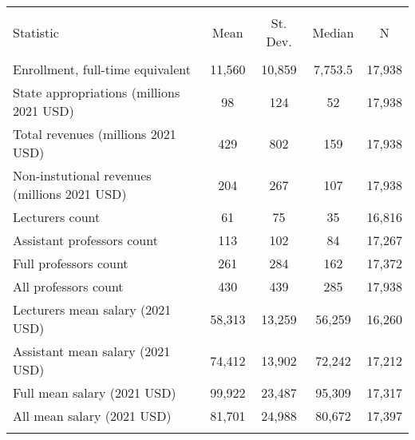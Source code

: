 
\begin{tabular}{@{\extracolsep{5pt}}lcccc} 
\\[-1.8ex]\hline 
\hline \\[-1.8ex] 
Statistic & \multicolumn{1}{c}{Mean} & \multicolumn{1}{c}{St. Dev.} & \multicolumn{1}{c}{Median} & \multicolumn{1}{c}{N} \\ 
\hline \\[-1.8ex] 
Enrollment, full-time equivalent & 11,560 & 10,859 & 7,753.5 & 17,938 \\ 
State appropriations (millions 2021 USD) & 98 & 124 & 52 & 17,938 \\ 
Total revenues (millions 2021 USD) & 429 & 802 & 159 & 17,938 \\ 
Non-instutional revenues (millions 2021 USD) & 204 & 267 & 107 & 17,938 \\ 
Lecturers count & 61 & 75 & 35 & 16,816 \\ 
Assistant professors count & 113 & 102 & 84 & 17,267 \\ 
Full professors count & 261 & 284 & 162 & 17,372 \\ 
All professors count & 430 & 439 & 285 & 17,938 \\ 
Lecturers mean salary (2021 USD) & 58,313 & 13,259 & 56,259 & 16,260 \\ 
Assistant mean salary (2021 USD) & 74,412 & 13,902 & 72,242 & 17,212 \\ 
Full mean salary (2021 USD) & 99,922 & 23,487 & 95,309 & 17,317 \\ 
All mean salary (2021 USD) & 81,701 & 24,988 & 80,672 & 17,397 \\ 
\hline \\[-1.8ex] 
\end{tabular} 
